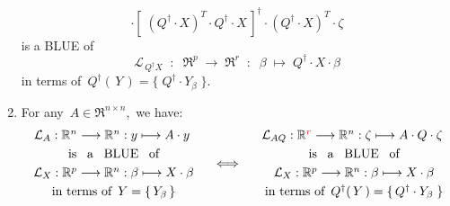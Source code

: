 \begin{theorem}
\begin{enumerate}
\begin{equation*}
		\cdot
		\left[\;(Q^{\dagger} \cdot X)^{T} \cdot Q^{\dagger} \cdot X \,\right]^{\dagger}
		\cdot
		(Q^{\dagger} \cdot X)^{T} \cdot \zeta
	\end{equation*}
	is a BLUE of
	\begin{equation*}
	\mathcal{L}_{\,Q^{\dagger}X}
	\;\; : \;\; \Re^{p} \; \longrightarrow \; \Re^{r}
	\;\; : \;\; \beta \; \longmapsto \; Q^{\dagger} \cdot X \cdot \beta
	\end{equation*}
	in terms of
	\,$Q^{\dagger}(\,Y\,) = \{\;Q^{\dagger} \cdot Y_{\beta}\;\}$.
\item
	For any \,$A \in \Re^{n \times n}$,\, we have:
	\begin{equation*}
	\begin{array}{c}
		\mathcal{L}_{A} : \Re^{n} \longrightarrow \Re^{n} : y \longmapsto A \cdot y
		\\{\color{white}\overset{.}{\vert}}
		\textnormal{is \, a \, BLUE \, of}
		\\{\color{white}\overset{.}{\vert}}
		\mathcal{L}_{X} : \Re^{p} \longrightarrow \Re^{n} : \beta \longmapsto X \cdot \beta
		\\{\color{white}\overset{.}{\vert}}
		\textnormal{in terms of \,$Y = \{\,Y_{\beta}\,\}$}
		\end{array}
	\quad\Longleftrightarrow\quad
		\begin{array}{c}
		\mathcal{L}_{AQ} : \Re^{\color{red}r} \longrightarrow \Re^{n} : \zeta \longmapsto A \cdot Q \cdot \zeta
		\\{\color{white}\overset{.}{\vert}}
		\textnormal{is \, a \, BLUE \, of}
		\\{\color{white}\overset{.}{\vert}}
		\mathcal{L}_{X} : \Re^{p} \longrightarrow \Re^{n} : \beta \longmapsto X \cdot \beta
		\\{\color{white}\overset{.}{\vert}}
		\textnormal{in terms of \,$Q^{\dagger}(\,Y\,) = \{\,Q^{\dagger} \cdot Y_{\beta}\;\}$}
	\end{array}
	\end{equation*}
\end{enumerate}
\end{theorem}
\proof
